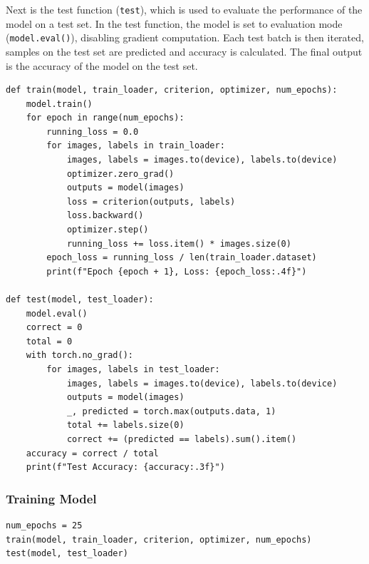 \documentclass[a4paper,12pt]{article}
\begin{document}
Next is the test function (\texttt{test}), which is used to evaluate the performance of the model on a test set. In the test function, the model is set to evaluation mode (\texttt{model.eval()}), disabling gradient computation. Each test batch is then iterated, samples on the test set are predicted and accuracy is calculated. The final output is the accuracy of the model on the test set.

\begin{lstlisting}
def train(model, train_loader, criterion, optimizer, num_epochs):
    model.train()
    for epoch in range(num_epochs):
        running_loss = 0.0
        for images, labels in train_loader:
            images, labels = images.to(device), labels.to(device)
            optimizer.zero_grad()
            outputs = model(images)
            loss = criterion(outputs, labels)
            loss.backward()
            optimizer.step()
            running_loss += loss.item() * images.size(0)
        epoch_loss = running_loss / len(train_loader.dataset)
        print(f"Epoch {epoch + 1}, Loss: {epoch_loss:.4f}")

def test(model, test_loader):
    model.eval()
    correct = 0
    total = 0
    with torch.no_grad():
        for images, labels in test_loader:
            images, labels = images.to(device), labels.to(device)
            outputs = model(images)
            _, predicted = torch.max(outputs.data, 1)
            total += labels.size(0)
            correct += (predicted == labels).sum().item()
    accuracy = correct / total
    print(f"Test Accuracy: {accuracy:.3f}")
\end{lstlisting}

\subsubsection{Training Model}
\begin{lstlisting}
num_epochs = 25
train(model, train_loader, criterion, optimizer, num_epochs)
test(model, test_loader)
\end{lstlisting}
\end{document}
